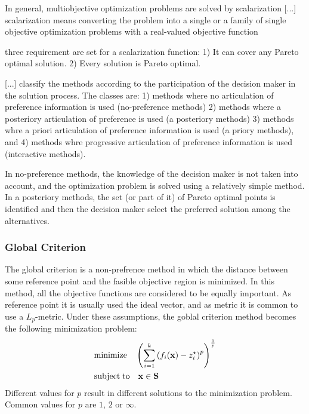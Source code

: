 {{\color{red} In general, multiobjective optimization problems are solved by scalarization [...] scalarization means converting the problem into a single or a family of single objective optimization problems with a real-valued objective function}

{\color{red} three requirement are set for a scalarization function: 1)  It can cover any Pareto optimal solution. 2) Every solution is Pareto optimal.}

{\color{red} [...] classify the methods according to the participation of the decision maker in the solution process. The classes are: 1) methods where no articulation of preference information is used (no-preference methods) 2) methods where a posteriory articulation of preference is used (a posteriory methods) 3) methods whre a priori articulation of preference information is used (a priory methods), and 4) methods whre progressive articulation of preference information is used (interactive methods).}

In no-preference methods, the knowledge of the decision maker is not taken into account, and the optimization problem is solved using a relatively simple method. In a posteriory methods, the set (or part of it) of Pareto optimal points is identified and then the decision maker select the preferred solution among the alternatives.

\subsubsection{Global Criterion}
\label{sub:multiobjective_global_criterion}

The global criterion is a non-prefrence method in which the distance between some reference point and the fasible objective region is minimized. In this method, all the objective functions are considered to be equally important. As reference point it is usually used the ideal vector, and as metric it is common to use a $L_p$-metric. Under these assumptions, the goblal criterion method becomes the following minimization problem:
\begin{align*}
     & \text{minimize}    \quad \left( \sum_{i=1}^k \left( f_i(\mathbf{x}) - z_i^\star \right)^p \right)^{\frac{1}{p}} \\
     & \text{subject\;to} \quad \mathbf{x} \in \mathbf{S}
\end{align*}
Different values for $p$ result in different solutions to the minimization problem. Common values for $p$ are $1$, $2$ or $\infty$. 

}
